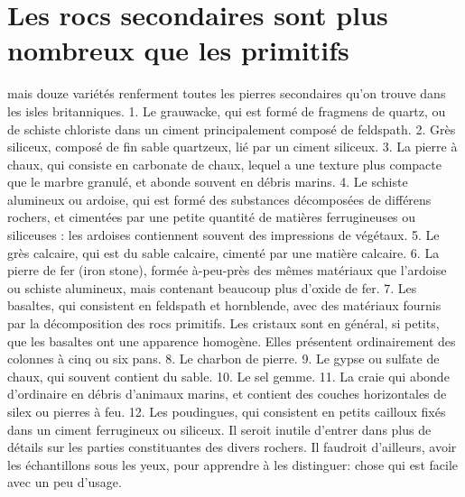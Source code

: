 \section{Les rocs secondaires sont plus nombreux que les primitifs}
mais douze variétés renferment toutes les pierres secondaires qu'on trouve dans les isles britanniques.
1. Le grauwacke, qui est formé de fragmens de quartz, ou de schiste chloriste dans\setcounter{page}{474} un ciment principalement composé de feldspath.
2. Grès siliceux, composé de fin sable quartzeux, lié par un ciment siliceux.
3. La pierre à chaux, qui consiste en carbonate de chaux, lequel a une texture plus compacte que le marbre granulé, et abonde souvent en débris marins.
4. Le schiste alumineux ou ardoise, qui est formé des substances décomposées de différens rochers, et cimentées par une petite quantité de matières ferrugineuses ou siliceuses : les ardoises contiennent souvent des impressions de végétaux.
5. Le grès calcaire, qui est du sable calcaire, cimenté par une matière calcaire.
6. La pierre de fer (iron stone), formée à-peu-près des mêmes matériaux que l'ardoise ou schiste alumineux, mais contenant beaucoup plus d'oxide de fer.
7. Les basaltes, qui consistent en feldspath et hornblende, avec des matériaux fournis par la décomposition des rocs primitifs. Les cristaux sont en général, si petits, que les basaltes ont une apparence homogène. Elles présentent ordinairement des colonnes à cinq ou six pans.
8. Le charbon de pierre.\setcounter{page}{475} 9. Le gypse ou sulfate de chaux, qui souvent contient du sable.
10. Le sel gemme.
11. La craie qui abonde d'ordinaire en débris d'animaux marins, et contient des couches horizontales de silex ou pierres à feu.
12. Les poudingues, qui consistent en petits cailloux fixés dans un ciment ferrugineux ou siliceux.
Il seroit inutile d'entrer dans plus de détails sur les parties constituantes des divers rochers. Il faudroit d'ailleurs, avoir les échantillons sous les yeux, pour apprendre à les distinguer: chose qui est facile avec un peu d'usage.
